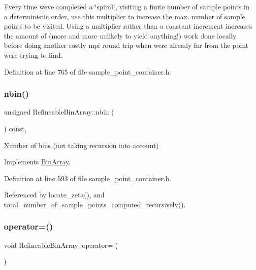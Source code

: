 Every time we\textquotesingle{}ve completed a \char`\"{}spiral\char`\"{}, visiting a finite number of sample points in a deterministic order, use this multiplier to increase the max. number of sample points to be visited. Using a multiplier rather than a constant increment increases the amount of (more and more unlikely to yield anything!) work done locally before doing another costly mpi round trip when we\textquotesingle{}re already far from the point we\textquotesingle{}re trying to find. 



Definition at line 765 of file sample\+\_\+point\+\_\+container.\+h.

\mbox{\label{classRefineableBinArray_a5975657726af982a4d67ff6470abb9d1}} 
\subsubsection{\texorpdfstring{nbin()}{nbin()}}
{\footnotesize\ttfamily unsigned Refineable\+Bin\+Array\+::nbin (\begin{DoxyParamCaption}{ }\end{DoxyParamCaption}) const\hspace{0.3cm}{\ttfamily [inline]}, {\ttfamily [virtual]}}



Number of bins (not taking recursion into account) 



Implements \hyperlink{classBinArray_aad085bf99d78162120c419f7504d256b}{Bin\+Array}.



Definition at line 593 of file sample\+\_\+point\+\_\+container.\+h.



Referenced by locate\+\_\+zeta(), and total\+\_\+number\+\_\+of\+\_\+sample\+\_\+points\+\_\+computed\+\_\+recursively().

\mbox{\label{classRefineableBinArray_aedf0b5374a41ba17415bee6778e07600}} 
\subsubsection{\texorpdfstring{operator=()}{operator=()}}
{\footnotesize\ttfamily void Refineable\+Bin\+Array\+::operator= (\begin{DoxyParamCaption}\item[{const \hyperlink{classRefineableBinArray}{Refineable\+Bin\+Array} \&}]{ }\end{DoxyParamCaption})\hspace{0.3cm}{\ttfamily [inline]}}



